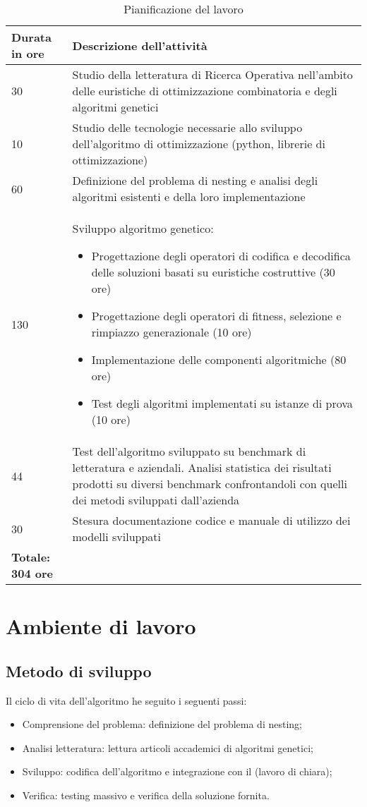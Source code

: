 \begin{table}[H]
\centering
\begin{tabular}{|l|p{10cm}|}
\hline
\textbf{Durata in ore} & \textbf{Descrizione dell'attività} \\ \hline
30 & Studio della letteratura di Ricerca Operativa nell’ambito delle euristiche di ottimizzazione combinatoria e degli algoritmi genetici \\ \hline
10 & Studio delle tecnologie necessarie allo sviluppo dell’algoritmo di ottimizzazione (python, librerie di ottimizzazione) \\ \hline
60 & Definizione del problema di nesting e analisi degli algoritmi esistenti e della loro implementazione \\ \hline
130 & Sviluppo algoritmo genetico:
\begin{itemize}
    \item Progettazione degli operatori di codifica e decodifica delle soluzioni basati su euristiche costruttive (30 ore)
    \item Progettazione degli operatori di fitness, selezione e rimpiazzo generazionale (10 ore)
    \item Implementazione delle componenti algoritmiche (80 ore)
    \item Test degli algoritmi implementati su istanze di prova (10 ore)
\end{itemize} \\ \hline
44 & Test dell'algoritmo sviluppato su benchmark di letteratura e aziendali. Analisi statistica dei risultati prodotti su diversi benchmark confrontandoli con quelli dei metodi sviluppati dall'azienda \\ \hline
30 & Stesura documentazione codice e manuale di utilizzo dei modelli sviluppati \\ \hline
\textbf{Totale: 304 ore} & \\ \hline
\end{tabular}
\caption{Pianificazione del lavoro}
\end{table}

\section{Ambiente di lavoro}
\subsection{Metodo di sviluppo}
Il ciclo di vita dell'algoritmo he seguito i seguenti passi:
\begin{itemize}
    \item Comprensione del problema: definizione del problema di nesting;
    \item Analisi letteratura: lettura articoli accademici di algoritmi genetici;
    \item Sviluppo: codifica dell'algoritmo e integrazione con il (lavoro di chiara);
    \item Verifica: testing massivo e verifica della soluzione fornita.
\end{itemize}

